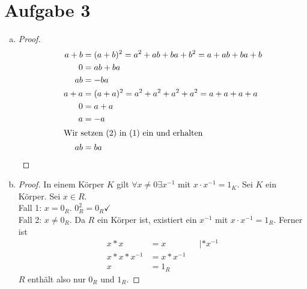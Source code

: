 \documentclass{article}
\begin{document}
	\section*{Aufgabe 3}
	\begin{enumerate}[a)]
		\item \begin{proof}
			\begin{align}
				a+b &= (a+b)^2 = a^2 + ab + ba + b^2 = a + ab + ba + b\nonumber\\
				0 &= ab + ba\nonumber\\
				ab &= -ba\\
				a+a &= (a+a)^2 = a^2 + a^2 + a^2 + a^2 = a + a + a+ a\nonumber\\
				0 &= a + a\nonumber\\
				a &= -a\\
				\intertext{Wir setzen (2) in (1) ein und erhalten}
				ab &= ba
			\end{align}
		\end{proof}
		\item \begin{proof}
			In einem Körper $K$ gilt $\forall x \neq 0\exists x^{-1}$ mit $x \cdot x^{-1} = 1_K$.
			Sei $K$ ein Körper.
			Sei $x\in R$.\\
			Fall 1: $x = 0_R$. $0_R^2 = 0_R\checkmark$\\
			Fall 2: $x\neq 0_R$. Da $R$ ein Körper ist, existiert ein $x^{-1}$ mit $x\cdot x^{-1} = 1_R$.
			Ferner ist \begin{align*}
				x*x &= x &&|*x^{-1}\\
				x*x*x^{-1} &= x*x^{-1}\\
				x &= 1_R
			\end{align*}
			$R$ enthält also nur $0_R$ und $1_R$.
		\end{proof}
	\end{enumerate}
\end{document}
